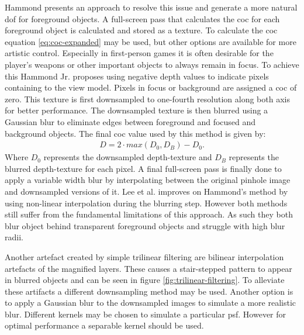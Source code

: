 Hammond \cite{Hammon.2008} presents an approach to resolve this issue and generate a more natural \gls{dof} for foreground objects.
A full-screen pass that calculates the \gls{coc} for each foreground object is calculated and stored as a texture.
To calculate the \gls{coc} equation \ref{eq:coc-expanded} may be used, but other options are available for more artistic control.
Especially in first-person games it is often desirable for the player's weapons or other important objects to always remain in focus.
To achieve this Hammond Jr. proposes using negative depth values to indicate pixels containing to the view model.
Pixels in focus or background are assigned a \gls{coc} of zero.
This texture is first downsampled to one-fourth resolution along both axis for better performance.
The downsampled texture is then blurred using a Gaussian blur to eliminate edges between foreground and focused and background objects.
The final \gls{coc} value used by this method is given by:
\begin{align}
    D = 2 \cdot max(D_0, D_B) - D_0.
\end{align}
Where $D_0$ represents the downsampled depth-texture and $D_B$ represents the blurred depth-texture for each pixel.
A final full-screen pass is finally done to apply a variable width blur by interpolating between the original pinhole image and downsampled versions of it.
Lee et al. \cite{Lee.2009} improves on Hammond's method by using non-linear interpolation during the blurring step.
However both methods still suffer from the fundamental limitations of this approach.
As such they both blur object behind transparent foreground objects and struggle with high blur radii.

Another artefact created by simple trilinear filtering are bilinear interpolation artefacts of the magnified layers.
These causes a stair-stepped pattern to appear in blurred objects and can be seen in figure \ref{fig:trilinear-filtering}.
To alleviate these artifacts a different downsampling method may be used.
Another option is to apply a Gaussian blur to the downsampled images to simulate a more realistic blur.
Different kernels may be chosen to simulate a particular \gls{psf}.
However for optimal performance a separable kernel should be used.\cite{Demers.2005, Gilham.2007}


